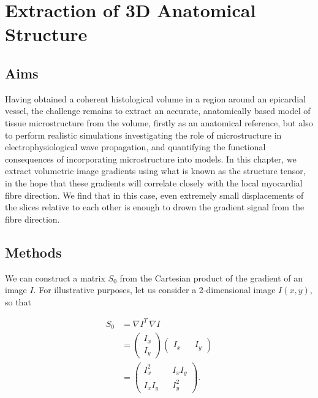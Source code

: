 \chapter{Extraction of 3D Anatomical Structure}
\dblspace

\section{Aims} %
\label{sec:aims}
  Having obtained a coherent histological volume in a region around an epicardial vessel, the challenge remains to extract an accurate, anatomically based model of tissue microstructure from the volume, firstly as an anatomical reference, but also to perform realistic simulations investigating the role of microstructure in electrophysiological wave propagation, and quantifying the functional consequences of incorporating microstructure into models. In this chapter, we extract volumetric image gradients using what is known as the structure tensor, in the hope that these gradients will correlate closely with the local myocardial fibre direction. We find that in this case, even extremely small displacements of the slices relative to each other is enough to drown the gradient signal from the fibre direction.

\section{Methods} %
\label{sec:methods}
  We can construct a matrix $S_0$ from the Cartesian product of the gradient of an image $I$. For illustrative purposes, let us consider a 2-dimensional image $I(x,y)$, so that
  
  \begin{align}
    S_0 &= \nabla I^T \, \nabla I \\
        &= \begin{pmatrix}
      I_x \\
      I_y
    \end{pmatrix} \begin{pmatrix}
      I_x && I_y
    \end{pmatrix} \\
        &= \begin{pmatrix}
          I_x^2 && I_xI_y \\
          I_xI_y && I_y^2
        \end{pmatrix}.
  \end{align}
  
